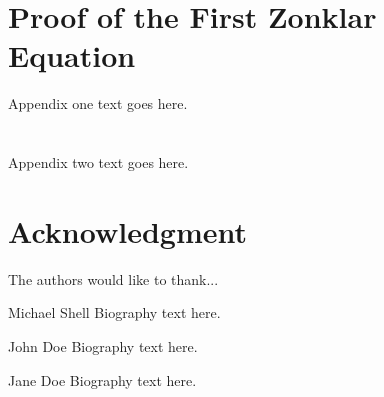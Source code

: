\documentclass[journal]{IEEEtran}
\begin{document}
\appendices
\section{Proof of the First Zonklar Equation}
Appendix one text goes here.

\section{}
Appendix two text goes here.


\section*{Acknowledgment}


The authors would like to thank...


\ifCLASSOPTIONcaptionsoff
  \newpage
\fi

\printbibliography

\begin{IEEEbiography}{Michael Shell}
Biography text here.
\end{IEEEbiography}

\begin{IEEEbiographynophoto}{John Doe}
Biography text here.
\end{IEEEbiographynophoto}


\begin{IEEEbiographynophoto}{Jane Doe}
Biography text here.
\end{IEEEbiographynophoto}






\end{document}
